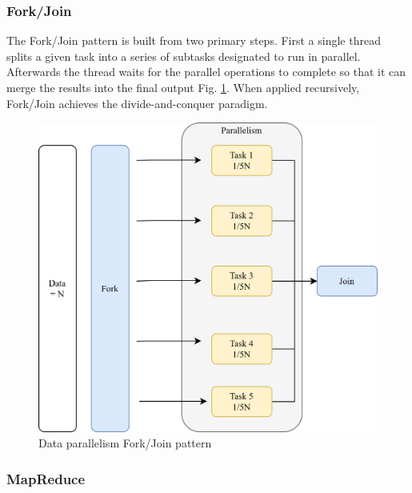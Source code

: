 \subsubsection{Fork/Join}
\label{sec: ForkJoin}
The Fork/Join pattern is built from two primary steps. First a single thread splits a given task into a series of subtasks designated to run in parallel. Afterwards the thread waits for the parallel operations to complete so that it can merge the results into the final output Fig. \ref{fig:ForkJoin}. When applied recursively, Fork/Join achieves the divide-and-conquer paradigm.

\begin{figure}[htb]
	\centering
		\includegraphics[scale=1.0]{figures02/forkjoin.png}
		\caption{Data parallelism Fork/Join pattern}
		\label{fig:ForkJoin}
\end{figure}

\subsubsection{MapReduce}
\label{sec: MapReduce}

